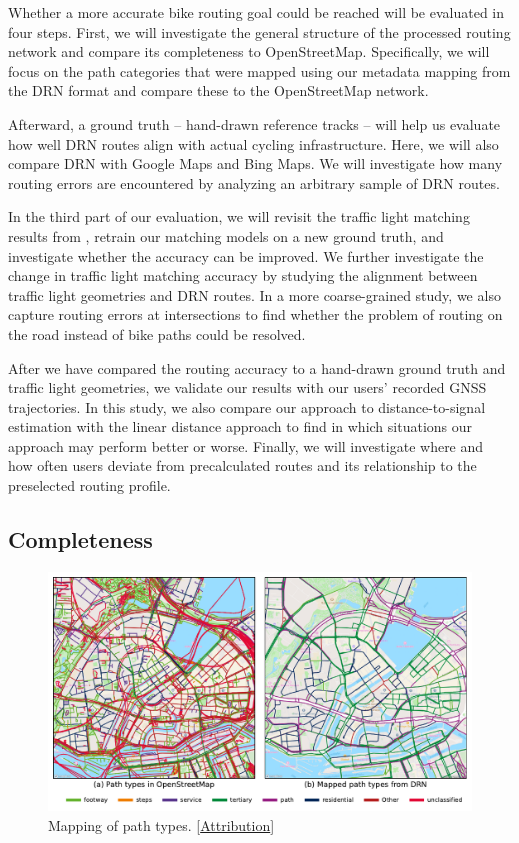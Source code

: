 Whether a more accurate bike routing goal could be reached will be evaluated in four steps. First, we will investigate the general structure of the processed routing network and compare its completeness to OpenStreetMap. Specifically, we will focus on the path categories that were mapped using our metadata mapping from the DRN format and compare these to the OpenStreetMap network. 

Afterward, a ground truth -- hand-drawn reference tracks -- will help us evaluate how well DRN routes align with actual cycling infrastructure. Here, we will also compare DRN with Google Maps and Bing Maps. We will investigate how many routing errors are encountered by analyzing an arbitrary sample of DRN routes.

In the third part of our evaluation, we will revisit the traffic light matching results from , retrain our matching models on a new ground truth, and investigate whether the accuracy can be improved. We further investigate the change in traffic light matching accuracy by studying the alignment between traffic light geometries and DRN routes. In a more coarse-grained study, we also capture routing errors at intersections to find whether the problem of routing on the road instead of bike paths could be resolved. 

After we have compared the routing accuracy to a hand-drawn ground truth and traffic light geometries, we validate our results with our users' recorded GNSS trajectories. In this study, we also compare our approach to distance-to-signal estimation with the linear distance approach to find in which situations our approach may perform better or worse. Finally, we will investigate where and how often users deviate from precalculated routes and its relationship to the preselected routing profile.

\subsection{Completeness}

\begin{figure}[t]
\centering
\includegraphics[width=\linewidth]{images/routing-drn-osm-map.pdf}
\caption{Mapping of path types. [\hyperref[attribution]{Attribution}]}
\label{fig:routing-drn-osm-map}
\end{figure}

